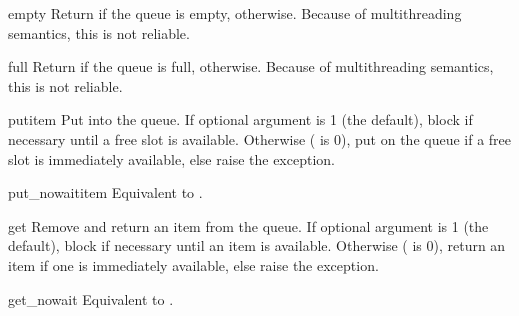 \begin{methoddesc}{empty}{}
Return  if the queue is empty,  otherwise.  Because
of multithreading semantics, this is not reliable.
\end{methoddesc}

\begin{methoddesc}{full}{}
Return  if the queue is full,  otherwise.  Because of
multithreading semantics, this is not reliable.
\end{methoddesc}

\begin{methoddesc}{put}{item}
Put  into the queue.  If optional argument  is 1
(the default), block if necessary until a free slot is available.
Otherwise ( is 0), put  on the queue if a free
slot is immediately available, else raise the 
exception.
\end{methoddesc}

\begin{methoddesc}{put_nowait}{item}
Equivalent to .
\end{methoddesc}

\begin{methoddesc}{get}{}
Remove and return an item from the queue.  If optional argument
 is 1 (the default), block if necessary until an item is
available.  Otherwise ( is 0), return an item if one is
immediately available, else raise the
 exception.
\end{methoddesc}

\begin{methoddesc}{get_nowait}{}
Equivalent to .
\end{methoddesc}
